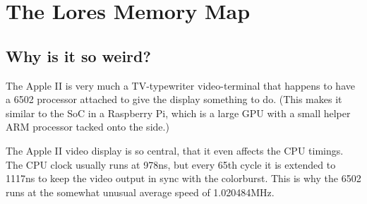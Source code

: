 

\newcommand*\rot{\rotatebox{90}}


%

\newpage

\section{The Lores Memory Map}

\subsection{Why is it so weird?}

The Apple II is very much
a TV-typewriter video-terminal that happens to have a 6502
processor attached to give the display something to do.
(This makes it similar to the SoC in a Raspberry Pi, which is
a large GPU with a small helper ARM processor tacked onto the side.)

The Apple II video display is so central, that it even affects the
CPU timings.
The CPU clock usually runs at 978ns, but every 65th cycle
it is extended to 1117ns to keep the video output in sync with the colorburst.
This is why the 6502 runs at the somewhat unusual average speed of 1.020484MHz.

